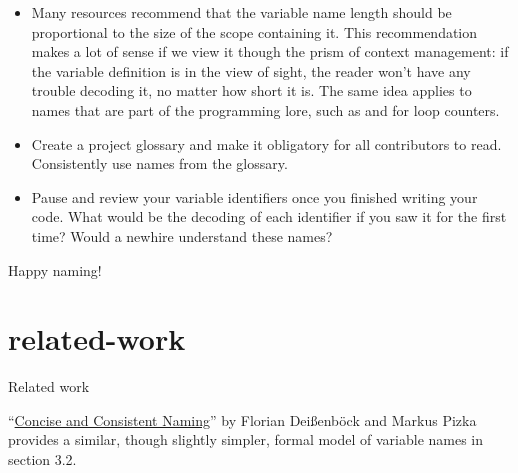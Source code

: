 \documentclass{article}
\begin{document}
\begin{itemize}
\item
  Many resources recommend that the variable name length should be proportional to the size of the scope containing it.
  This recommendation makes a lot of sense if we view it though the prism of context management: if the variable definition is in the view of sight, the reader won't have any trouble decoding it, no matter how short it is.
  The same idea applies to names that are part of the programming lore, such as  and  for loop counters.
\item
  Create a project glossary and make it obligatory for all contributors to read.
  Consistently use names from the glossary.
\item
  Pause and review your variable identifiers once you finished writing your code.
  What would be the decoding of each identifier if you saw it for the first time?
  Would a newhire understand these names?
\end{itemize}

Happy naming!

\section{related-work}{Related work}

``\href{https://teamscale.com/hubfs/26978363/Publications/2005-concise-and-consistent-naming.pdf}{Concise and Consistent Naming}'' by Florian Deißenböck and Markus Pizka provides a similar, though slightly simpler, formal model of variable names in section 3.2.
\end{document}
